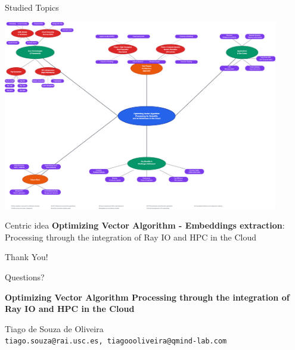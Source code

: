 \documentclass[aspectratio=169]{beamer}
\begin{document}
\begin{frame}{Studied Topics}
    \begin{center}
        \includegraphics[width=0.9\textwidth,height=0.6\textheight,keepaspectratio]{../../images/TFM-MindMap.drawio.png}
    \end{center}
    
    \vspace{0.3cm}
    \begin{block}{Centric idea}
        \textbf{Optimizing Vector Algorithm - Embeddings extraction}:  Processing through the integration of Ray IO and HPC in the Cloud
    \end{block}
\end{frame}

\begin{frame}[plain]
    \begin{center}
        \Huge Thank You!
        
        \vspace{1cm}
        \Large Questions?
        
        \vspace{0.8cm}
        \normalsize
        \textbf{Optimizing Vector Algorithm Processing through the integration of Ray IO and HPC in the Cloud}
        
        \vspace{0.5cm}
        Tiago de Souza de Oliveira \\
        \texttt{tiago.souza@rai.usc.es, tiagoooliveira@qmind-lab.com}
    \end{center}
\end{frame}
\end{document}
